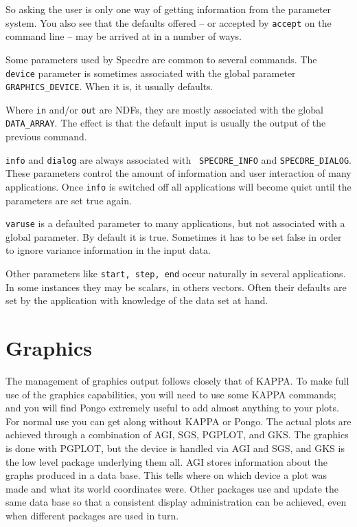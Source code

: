 So asking the user is only one way of getting information from the parameter
system. You also see that the defaults offered -- or accepted by {\tt accept}
on the command line -- may be arrived at in a number of ways.

Some parameters used by Specdre are common to several commands. The {\tt
device} parameter is sometimes associated with the global parameter {\tt
GRAPHICS\_DEVICE}. When it is, it usually defaults.

Where {\tt in} and/or {\tt out} are NDFs, they are mostly associated with the
global {\tt DATA\_ARRAY}. The effect is that the default input is usually the
output of the previous command.

{\tt info} and {\tt dialog} are always associated with {\tt
SPECDRE\_INFO} and {\tt SPECDRE\_DIALOG}. These parameters control the
amount of information and user interaction of many applications. Once
{\tt info} is switched off all applications will become quiet until the
parameters are set true again.

{\tt varuse} is a defaulted parameter to many applications, but not associated
with a global parameter. By default it is true. Sometimes it has to be set
false in order to ignore variance information in the input data.

Other parameters like {\tt start, step, end} occur naturally in several
applications. In some instances they may be scalars, in others vectors.
Often their defaults are set by the application with knowledge of the data set
at hand.


\goodbreak
\section{Graphics}
\label{graphic}

The management of graphics output follows closely that of KAPPA. To make
full use of the graphics capabilities, you will need to use some KAPPA
commands; and you will find Pongo extremely useful to add almost
anything to your plots.  For normal use you can get along without
KAPPA or Pongo.
The actual plots are achieved through a combination of AGI, SGS,
PGPLOT, and GKS. The graphics is done with PGPLOT, but the device is
handled via AGI and SGS, and GKS is the low level package underlying
them all.  AGI stores information about the graphs produced in a data
base. This tells where on which device a plot was made and what its
world coordinates were.  Other packages use and update the same data
base so that a consistent display administration can be achieved, even
when different packages are used in turn.

